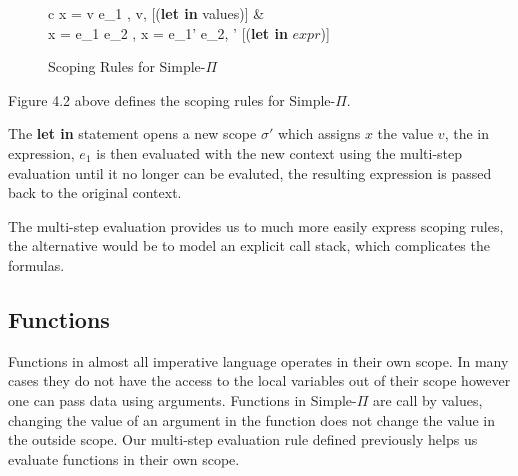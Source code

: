 \documentclass[a4paper,12pt]{report}
\begin{document}
\begin{figure}[H]
  \begin{center}
    \begin{tabular}{c}
      {\langle {}x = v  e_1 , \sigma \rangle 
      \longrightarrow \langle v, \sigma\rangle} [(\textbf{let in} values)] 
      & \\
      {\langle {}x = e_1  e_2 , \sigma \rangle 
      \longrightarrow \langle {}x = e_1'  e_2, \sigma' \rangle} 
      [(\textbf{let in} $expr$)]
    \end{tabular}
  \end{center}
  \caption{Scoping Rules for Simple-$\Pi$}
\end{figure}

\par
Figure 4.2 above defines the scoping rules for Simple-$\Pi$.

\par
The \textbf{let in} statement opens a new scope $\sigma'$ which 
assigns $x$ the value $v$, the in expression, $e_1$ is then evaluated with the 
new context using the multi-step evaluation until it no longer can be evaluted, 
the resulting expression is passed back to the original context.

\par
The multi-step evaluation provides us to much more easily express scoping rules, 
the alternative would be to model an explicit call stack, which complicates the 
formulas.

\subsection{Functions}
Functions in almost all imperative language operates in their own scope. In many 
cases they do not have the access to the local variables out of their scope however 
one can pass data using arguments. Functions in Simple-$\Pi$ are call by values, 
changing the value of an argument in the function does not change the value in 
the outside scope. Our multi-step evaluation rule defined previously helps us 
evaluate functions in their own scope. 
\end{document}
